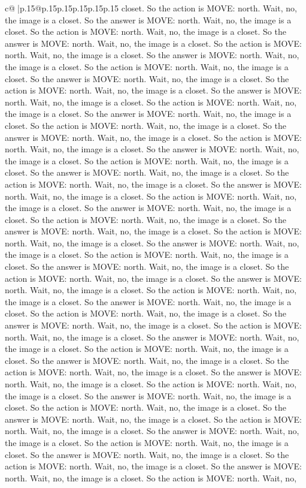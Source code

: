 \documentclass{article}
\begin{document}
{\begin{supertabular}{c@{$\;$}|p{.15\linewidth}@{}p{.15\linewidth}p{.15\linewidth}p{.15\linewidth}p{.15\linewidth}p{.15\linewidth}}
{{{closet. So the action is MOVE: north. Wait, no, the image is a closet. So the answer is MOVE: north. Wait, no, the image is a closet. So the action is MOVE: north. Wait, no, the image is a closet. So the answer is MOVE: north. Wait, no, the image is a closet. So the action is MOVE: north. Wait, no, the image is a closet. So the answer is MOVE: north. Wait, no, the image is a closet. So the action is MOVE: north. Wait, no, the image is a closet. So the answer is MOVE: north. Wait, no, the image is a closet. So the action is MOVE: north. Wait, no, the image is a closet. So the answer is MOVE: north. Wait, no, the image is a closet. So the action is MOVE: north. Wait, no, the image is a closet. So the answer is MOVE: north. Wait, no, the image is a closet. So the action is MOVE: north. Wait, no, the image is a closet. So the answer is MOVE: north. Wait, no, the image is a closet. So the action is MOVE: north. Wait, no, the image is a closet. So the answer is MOVE: north. Wait, no, the image is a closet. So the action is MOVE: north. Wait, no, the image is a closet. So the answer is MOVE: north. Wait, no, the image is a closet. So the action is MOVE: north. Wait, no, the image is a closet. So the answer is MOVE: north. Wait, no, the image is a closet. So the action is MOVE: north. Wait, no, the image is a closet. So the answer is MOVE: north. Wait, no, the image is a closet. So the action is MOVE: north. Wait, no, the image is a closet. So the answer is MOVE: north. Wait, no, the image is a closet. So the action is MOVE: north. Wait, no, the image is a closet. So the answer is MOVE: north. Wait, no, the image is a closet. So the action is MOVE: north. Wait, no, the image is a closet. So the answer is MOVE: north. Wait, no, the image is a closet. So the action is MOVE: north. Wait, no, the image is a closet. So the answer is MOVE: north. Wait, no, the image is a closet. So the action is MOVE: north. Wait, no, the image is a closet. So the answer is MOVE: north. Wait, no, the image is a closet. So the action is MOVE: north. Wait, no, the image is a closet. So the answer is MOVE: north. Wait, no, the image is a closet. So the action is MOVE: north. Wait, no, the image is a closet. So the answer is MOVE: north. Wait, no, the image is a closet. So the action is MOVE: north. Wait, no, the image is a closet. So the answer is MOVE: north. Wait, no, the image is a closet. So the action is MOVE: north. Wait, no, the image is a closet. So the answer is MOVE: north. Wait, no, the image is a closet. So the action is MOVE: north. Wait, no, the image is a closet. So the answer is MOVE: north. Wait, no, the image is a closet. So the action is MOVE: north. Wait, no, the image is a closet. So the answer is MOVE: north. Wait, no, the image is a closet. So the action is MOVE: north. Wait, no, the image is a closet. So the answer is MOVE: north. Wait, no, the image is a closet. So the action is MOVE: north. Wait, no, the image is a closet. So the answer is MOVE: north. Wait, no, the image is a closet. So the action is MOVE: north. Wait, no, the image is a closet. So the answer is MOVE: north. Wait, no, the image is a closet. So the action is MOVE: north. Wait, no, }}}
\end{supertabular}}
\end{document}
